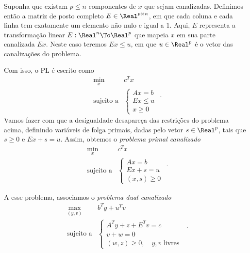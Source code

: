 Suponha que existam $p\leq n$ componentes de $x$ que sejam canalizadas. Definimos então a matriz de posto completo $E\in\Real^{p\times n}$, em que cada coluna e cada linha tem exatamente um elemento não nulo e igual a 1. Aqui, $E$  representa a transformação linear $E:\Real^{n}\To \Real^{p}$ que mapeia $x$ em sua parte canalizada $Ex$. Neste caso teremos $Ex \leq u$, em que $u\in\Real^{p}$ é o vetor das canalizações do problema.


Com isso, o \ac{PL} é escrito como 
\begin{equation*}
	\begin{array}{lc}
\displaystyle \min_{x} & c^Tx \\
\text{sujeito a} &\begin{cases} Ax = b \\
								Ex \leq u	\\				 
				 x \geq 0	
				 \end{cases}
\end{array}.
\end{equation*}
Vamos fazer com que a desigualdade desapareça das restrições do problema acima, definindo variáveis de folga primais, dadas pelo vetor $s\in\Real^{p}$, tais que $s\geq 0$ e $Ex +s =  u$. Assim, obtemos o \emph{problema primal canalizado}
\begin{equation}
\label{eq:introPL-primal-bounded}
	\begin{array}{lc}
\displaystyle \min_{x} & c^Tx \\
\text{sujeito a} &\begin{cases} Ax = b \\
								Ex +s =  u	\\				 
				 (x,s) \geq 0	
				 \end{cases}
\end{array}.
\end{equation}

A esse problema, associamos o \emph{problema dual canalizado}
\begin{equation}
\label{eq:introPL-dual-bounded}
\begin{array}{lc}
\displaystyle \max_{(y,v)} & b^Ty + u^{T}v \\
\text{sujeito a} &\begin{cases} A^Ty +z + E^Tv =  c \\
								v + w = 0 \\ 
				 (w,z)\geq 0, \quad y,v \text{ livres}	
				 \end{cases}\
\end{array}.
\end{equation}


